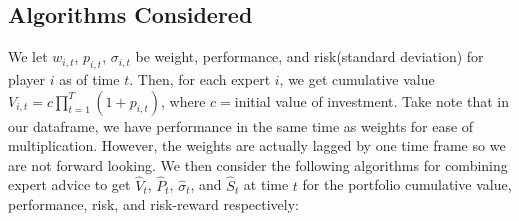 \documentclass{article}
\begin{document}
\subsection{Algorithms Considered}
\label{subsec:algorithms}
We let $w_{i,t}$, $p_{i,t}$, $\sigma_{i,t}$ be weight, performance, and risk(standard deviation) for player $i$ as of time $t$. Then, for each expert $i$, we get cumulative value $V_{i,t}=c\prod_{t=1}^{T}(1+p_{i,t})$, where $c=$initial value of investment. Take note that in our dataframe, we have performance in the same time as weights for ease of multiplication. However, the weights are actually lagged by one time frame so we are not forward looking. We then consider the following algorithms for combining expert advice to get $\hat{V}_{t}$, $\hat{P}_{t}$, $\hat{\sigma}_{t}$, and $\hat{S}_{t}$ at time $t$ for the portfolio cumulative value, performance, risk, and risk-reward respectively:
\end{document}
